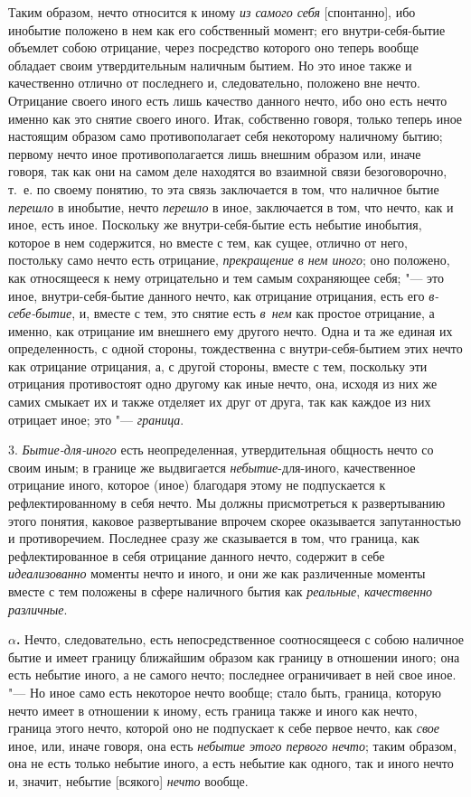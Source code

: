 Таким образом, нечто относится к иному {\em из самого
себя} [спонтанно], ибо инобытие положено в нем как его собственный
момент; его внутри-себя-бытие объемлет собою отрицание, через посредство
которого оно теперь вообще обладает своим утвердительным наличным бытием.
Но это иное также и качественно отлично от последнего и, следовательно,
положено вне нечто. Отрицание своего иного есть лишь качество данного
нечто, ибо оно есть нечто именно как это снятие своего иного. Итак,
собственно говоря, только теперь иное настоящим образом само
противополагает себя некоторому наличному бытию; первому нечто иное
противополагается лишь внешним образом или, иначе говоря, так как они на
самом деле находятся во взаимной связи безоговорочно, т.~е. по своему
понятию, то эта связь заключается в том, что наличное бытие
{\em перешло} в инобытие, нечто
{\em перешло} в иное, заключается в том, что нечто,
как и иное, есть иное. Поскольку же внутри-себя-бытие есть небытие
инобытия, которое в нем содержится, но вместе с тем, как сущее, отлично от
него, постольку само нечто есть отрицание,
{\em прекращение в нем иного}; оно
положено, как относящееся к нему отрицательно и тем самым сохраняющее себя;
"--- это иное, внутри-себя-бытие данного нечто, как отрицание отрицания,
есть его {\em в-себе-бытие}, и, вместе с тем, это
снятие есть {\em в~нем} как простое отрицание, а
именно, как отрицание им внешнего ему другого нечто. Одна и та же единая их
определенность, с одной стороны, тождественна с внутри-себя-бытием этих
нечто как отрицание отрицания, а, с другой стороны, вместе с тем, поскольку
эти отрицания противостоят одно другому как иные нечто, она,
исходя из них же самих смыкает их и также отделяет их друг от друга,
так как каждое из них отрицает иное; это "--- {\em граница}.

3. {\em Бытие-для-иного} есть неопределенная,
утвердительная общность нечто со своим иным; в границе же выдвигается
{\em небытие}-для-иного, качественное отрицание
иного, которое (иное) благодаря этому не подпускается к
рефлектированному в себя нечто. Мы должны присмотреться к развертыванию
этого понятия, каковое развертывание впрочем скорее оказывается
запутанностью и противоречием. Последнее сразу же сказывается в том, что
граница, как рефлектированное в себя отрицание данного нечто, содержит в
себе {\em идеализованно} моменты нечто и иного, и они
же как различенные моменты вместе с тем положены в сфере наличного бытия
как {\em реальные},
{\em качественно различные}.

{\bfseries $\alpha $.} Нечто, следовательно, есть непосредственное
соотносящееся с собою наличное бытие и имеет границу ближайшим образом как
границу в отношении иного; она есть небытие иного, а не самого нечто;
последнее ограничивает в ней свое иное. "--- Но иное само есть некоторое
нечто вообще; стало быть, граница, которую нечто имеет в отношении к
иному, есть граница также и иного как нечто, граница этого нечто,
которой оно не подпускает к себе первое нечто, как
{\em свое} иное, или, иначе говоря, она есть
{\em небытие этого первого нечто}; таким образом, она
не есть только небытие иного, а есть небытие как одного, так и иного
нечто и, значит, небытие [всякого] {\em нечто} вообще.

